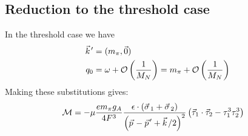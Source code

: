 \documentclass[11pt]{article}
\newcommand\ddfrac[2]{\frac{\displaystyle #1}{\displaystyle #2}}
\newcommand{\vectorwithspace}[1]{\vec{#1}\mkern2mu\vphantom{#1}}
\newcommand{\kv}{\vectorwithspace{k}}
\newcommand{\pv}{\vectorwithspace{p}}
\newcommand{\sigv}{\vectorwithspace{\sigma}}
\newcommand{\mpi}{\ensuremath{m_\pi}}
\newcommand{\ga}{\ensuremath{g_A}}
\newcommand{\calM}{\mathcal{M}} \newcommand{\calN}{\mathcal{N}}
\newcommand{\calO}{\mathcal{O}} \newcommand{\calP}{\mathcal{P}}
\newcommand{\ppv}{{\pv'}}
\begin{document}
\subsection{Reduction to the threshold case}
In the threshold case we have
\begin{align}
	\kv' & =(\mpi,\vec{0})                                                 \\
	q_0  & = \omega +\calO\left(\frac{1}{M_N}\right) = \mpi + \calO \left(
	\frac{1}{M_N}  \right)
\end{align}
Making these substitutions gives:
\begin{align}
	\calM & = -\mu\frac{e\mpi\ga}{4F^3}
	\ddfrac{\epsilon\cdot \left( \sigv_1 +\sigv_2 \right) }{\left(\pv-\ppv+ \kv/2\right)^2}
	\left(\vec{\tau}_1 \cdot \vec{\tau}_2-\tau_{1}^{3} \tau_{2}^{3}\right)
\end{align}
\end{document}
